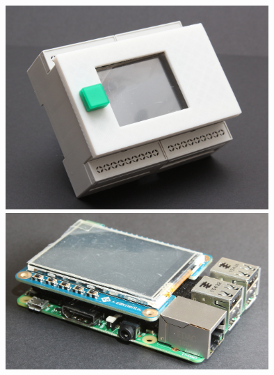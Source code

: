 {\begin{a3pages}
{\begin{minipage}{135mm}
        {\centering
            \includegraphics[width=100mm]{images/superv-photos/master.jpeg}
            \label{fig:hw:master:photo:master}
            \includegraphics[width=100mm]{images/superv-photos/raspi-1.jpeg}
            \label{fig:hw:master:photo:raspi}
        }
    \end{minipage}}
    \hspace*{15mm}
\end{a3pages}}
